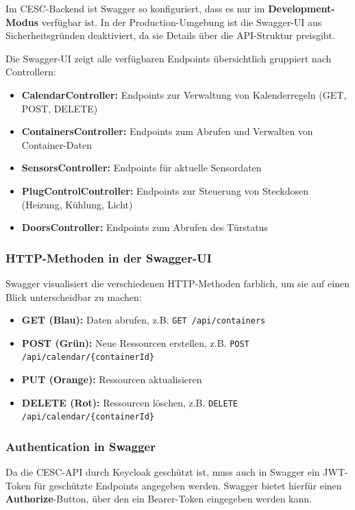 Im CESC-Backend ist Swagger so konfiguriert, dass es nur im \textbf{Development-Modus} verfügbar ist. In der Production-Umgebung ist die Swagger-UI aus Sicherheitsgründen deaktiviert, da sie Details über die API-Struktur preisgibt.

Die Swagger-UI zeigt alle verfügbaren Endpoints übersichtlich gruppiert nach Controllern:

\begin{itemize}
    \item \textbf{CalendarController:} Endpoints zur Verwaltung von Kalenderregeln (GET, POST, DELETE)
    \item \textbf{ContainersController:} Endpoints zum Abrufen und Verwalten von Container-Daten
    \item \textbf{SensorsController:} Endpoints für aktuelle Sensordaten
    \item \textbf{PlugControlController:} Endpoints zur Steuerung von Steckdosen (Heizung, Kühlung, Licht)
    \item \textbf{DoorsController:} Endpoints zum Abrufen des Türstatus
\end{itemize}

\subsubsection{HTTP-Methoden in der Swagger-UI}

Swagger visualisiert die verschiedenen HTTP-Methoden farblich, um sie auf einen Blick unterscheidbar zu machen:

\begin{itemize}
    \item \textbf{GET (Blau):} Daten abrufen, z.B. \texttt{GET /api/containers}
    \item \textbf{POST (Grün):} Neue Ressourcen erstellen, z.B. \texttt{POST /api/calendar/\{containerId\}}
    \item \textbf{PUT (Orange):} Ressourcen aktualisieren
    \item \textbf{DELETE (Rot):} Ressourcen löschen, z.B. \texttt{DELETE /api/calendar/\{containerId\}}
\end{itemize}

\subsubsection{Authentication in Swagger}

Da die CESC-API durch Keycloak geschützt ist, muss auch in Swagger ein JWT-Token für geschützte Endpoints angegeben werden. Swagger bietet hierfür einen \textbf{\glqq Authorize\grqq}-Button, über den ein Bearer-Token eingegeben werden kann.

